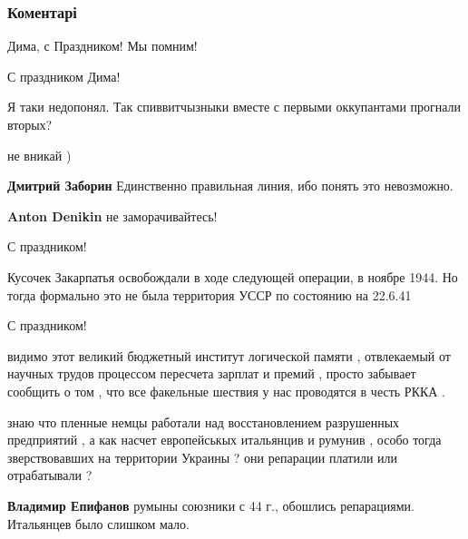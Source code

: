  
 
 
 
 
\subsubsection{Коментарі}

\begin{itemize} %
Дима, с Праздником! Мы помним!

С праздником Дима!

Я таки недопонял. Так спиввитчызныки вместе с первыми оккупантами прогнали вторых?

\begin{itemize} %
не вникай )

\textbf{Дмитрий Заборин} Единственно правильная линия, ибо понять это невозможно.

\textbf{Anton Denikin} не заморачивайтесь!
\end{itemize} %

С праздником!


Кусочек Закарпатья освобождали в ходе следующей операции, в ноябре 1944. Но
тогда формально это не была территория УССР по состоянию на 22.6.41

С праздником!


видимо этот великий бюджетный институт логической памяти , отвлекаемый от
научных трудов процессом пересчета зарплат и премий , просто забывает сообщить
о том , что все факельные шествия у нас проводятся в честь РККА .



знаю что пленные немцы работали над восстановлением разрушенных предприятий , а
как насчет европейськых итальянцив и румунив , особо тогда зверствовавших на
территории Украины ? они репарации платили или отрабатывали ?

\begin{itemize} %
\textbf{Владимир Епифанов} румыны союзники с 44 г., обошлись репарациями. Итальянцев было слишком мало.


\end{itemize}
\end{itemize}
